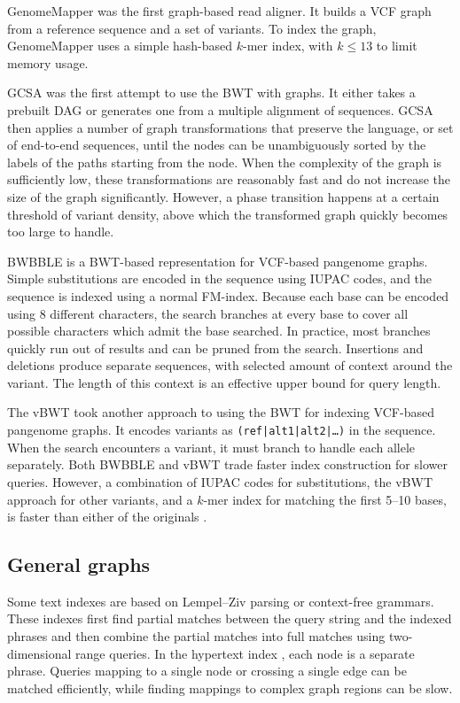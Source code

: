 GenomeMapper \cite{Schneeberger_2009} was the first graph-based read aligner.
It builds a VCF graph from a reference sequence and a set of variants.
To index the graph, GenomeMapper uses a simple hash-based $k$-mer index, with $k \le 13$ to limit memory usage.

GCSA \cite{Siren_2014} was the first attempt to use the BWT with graphs.
It either takes a prebuilt DAG or generates one from a multiple alignment of sequences.
GCSA then applies a number of graph transformations that preserve the language, or set of end-to-end sequences, until the nodes can be unambiguously sorted by the labels of the paths starting from the node.
When the complexity of the graph is sufficiently low, these transformations are reasonably fast and do not increase the size of the graph significantly.
However, a phase transition happens at a certain threshold of variant density, above which the transformed graph quickly becomes too large to handle.

BWBBLE \cite{Huang_2013} is a BWT-based representation for VCF-based pangenome graphs.
Simple substitutions are encoded in the sequence using IUPAC codes, and the sequence is indexed using a normal FM-index.
Because each base can be encoded using 8 different characters, the search branches at every base to cover all possible characters which admit the base searched.
In practice, most branches quickly run out of results and can be pruned from the search.
Insertions and deletions produce separate sequences, with selected amount of context around the variant.
The length of this context is an effective upper bound for query length.

The vBWT \cite{Maciuca_2016} took another approach to using the BWT for indexing VCF-based pangenome graphs.
It encodes variants as \texttt{(ref|alt1|alt2|\dots)} in the sequence.
When the search encounters a variant, it must branch to handle each allele separately.
Both BWBBLE and vBWT trade faster index construction for slower queries.
However, a combination of IUPAC codes for substitutions, the vBWT approach for other variants, and a $k$-mer index for matching the first 5--10 bases, is faster than either of the originals \cite{Buechler_2019}.

\subsection{General graphs}

Some text indexes are based on Lempel--Ziv parsing or context-free grammars.
These indexes first find partial matches between the query string and the indexed phrases and then combine the partial matches into full matches using two-dimensional range queries.
In the hypertext index \cite{Thachuk_2013}, each node is a separate phrase.
Queries mapping to a single node or crossing a single edge can be matched efficiently, while finding mappings to complex graph regions can be slow.

